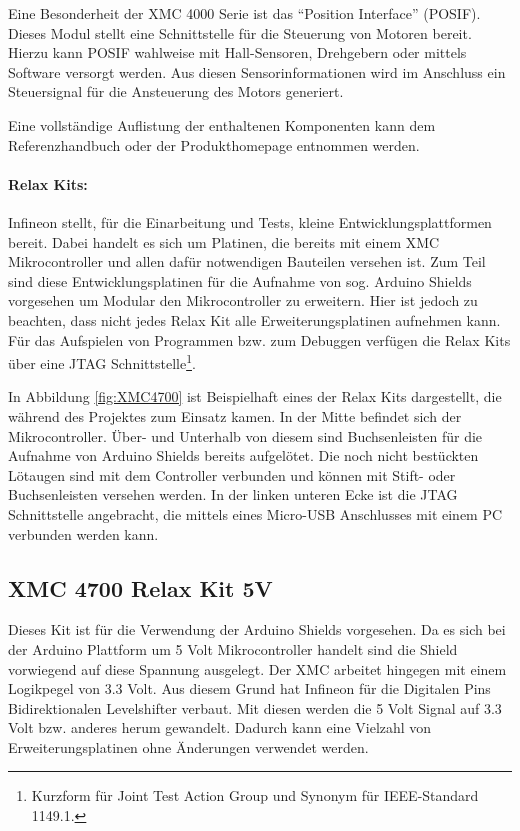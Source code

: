 Eine Besonderheit der XMC 4000 Serie ist das \enquote{Position Interface} (POSIF).
Dieses Modul stellt eine Schnittstelle für die Steuerung von Motoren bereit.
Hierzu kann POSIF wahlweise mit Hall-Sensoren, Drehgebern oder mittels Software versorgt werden.
Aus diesen Sensorinformationen wird im Anschluss ein Steuersignal für die Ansteuerung des Motors generiert.\cite{InfineonTechnologies2016a}

Eine vollständige Auflistung der enthaltenen Komponenten kann dem Referenzhandbuch \cite{InfineonTechnologies2016} oder der Produkthomepage \cite{InfineonTechnologies2017} entnommen werden.

\newpage
\paragraph{Relax Kits:}
Infineon stellt, für die Einarbeitung und Tests, kleine Entwicklungsplattformen bereit.
Dabei handelt es sich um Platinen, die bereits mit einem XMC Mikrocontroller und allen dafür notwendigen Bauteilen versehen ist.
Zum Teil sind diese Entwicklungsplatinen für die Aufnahme von sog. Arduino Shields vorgesehen um Modular den Mikrocontroller zu erweitern.
Hier ist jedoch zu beachten, dass nicht jedes Relax Kit alle Erweiterungsplatinen aufnehmen kann.
Für das Aufspielen von Programmen bzw. zum Debuggen verfügen die Relax Kits über eine JTAG Schnittstelle\footnote{Kurzform für Joint Test Action Group und Synonym für IEEE-Standard 1149.1.}.

In Abbildung \ref{fig:XMC4700} ist Beispielhaft eines der Relax Kits dargestellt, die während des Projektes zum Einsatz kamen.
In der Mitte befindet sich der Mikrocontroller. 
Über- und Unterhalb von diesem sind Buchsenleisten für die Aufnahme von Arduino Shields bereits aufgelötet.
Die noch nicht bestückten Lötaugen sind mit dem Controller verbunden und können mit Stift- oder Buchsenleisten versehen werden.
In der linken unteren Ecke ist die JTAG Schnittstelle angebracht, die mittels eines Micro-USB Anschlusses mit einem PC verbunden werden kann. 

\subsection{XMC 4700 Relax Kit 5V}
\label{sec:XMC4700}
Dieses Kit ist für die Verwendung der Arduino Shields vorgesehen.
Da es sich bei der Arduino Plattform um 5 Volt Mikrocontroller handelt sind die Shield vorwiegend auf diese Spannung ausgelegt.
Der XMC arbeitet hingegen mit einem Logikpegel von 3.3 Volt.
Aus diesem Grund hat Infineon für die Digitalen Pins Bidirektionalen Levelshifter verbaut.
Mit diesen werden die 5 Volt Signal auf 3.3 Volt bzw. anderes herum gewandelt.
Dadurch kann eine Vielzahl von Erweiterungsplatinen ohne Änderungen verwendet werden.

